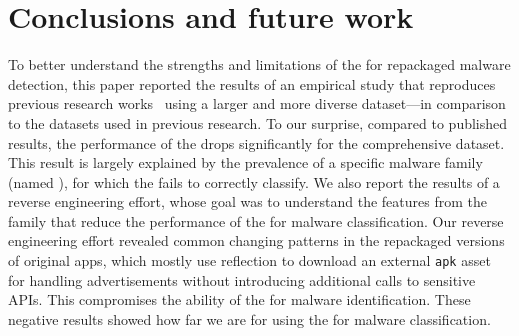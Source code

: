 \section{Conclusions and future work}\label{sec:conclusions}


To better understand the strengths and limitations of the \mas for repackaged malware detection,
this paper reported the results of an empirical study that reproduces previous research works~\cite{DBLP:conf/wcre/BaoLL18,DBLP:journals/jss/CostaMMSSBNR22}
using a larger and more diverse dataset---in comparison to the datasets used in previous research. To our surprise, compared to published results,
the performance of the \mas drops significantly for the comprehensive dataset. This result is largely
explained by the prevalence of a specific malware family (named \gps), for which the \mas fails to correctly classify.
We also report the results of a reverse engineering effort, whose goal was to understand the features from the \gps family that
reduce the performance of the \mas for malware classification. Our reverse engineering effort revealed common changing patterns in the \gps repackaged versions of original apps, which mostly use reflection to download an external
\texttt{apk} asset for handling advertisements without introducing additional calls to sensitive APIs. This
compromises the ability of the \mas for malware identification. 
These negative results showed how far we are for using the \mas for malware classification.



